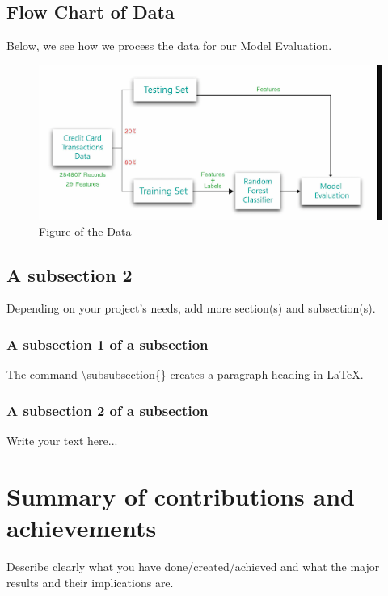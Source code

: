 

\subsection{Flow Chart of Data}
\label{sec:intro_some_sub1}


Below, we see how we process the data for our Model Evaluation.

\begin{figure}[ht]
    \centering
    \includegraphics[scale=0.3]{figures/FlowOfData.png}
    \caption{Figure of the Data}
    \label{fig:Plot of the Data}
\end{figure}

\subsection{A subsection 2}
\label{sec:intro_some_sub2}
Depending on your project's needs, add more section(s) and subsection(s).

\subsubsection{A subsection 1 of a subsection}
\label{sec:intro_some_subsub1}
The command \textbackslash subsubsection\{\} creates a paragraph heading in \LaTeX.

\subsubsection{A subsection 2 of a subsection}
\label{sec:intro_some_subsub2}
Write your text here...

\section{Summary of contributions and achievements} %
\label{sec:intro_sum_results} %
Describe clearly what you have done/created/achieved and what the major results and their implications are. 



